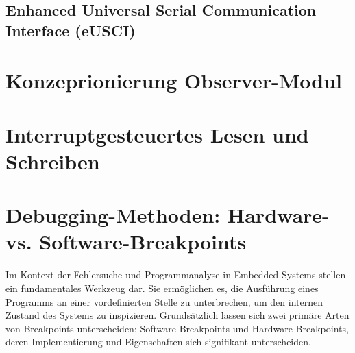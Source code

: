 \subsection{Enhanced Universal Serial Communication Interface (eUSCI)}
\label{eUSCI}



\section{Konzeprionierung Observer-Modul}
\label{Grundger\"ust_ObserverModul}

\section{Interruptgesteuertes Lesen und Schreiben}
\label{Interruptgesteuertes_Lesen&Schreiben}

\section{Debugging-Methoden: Hardware- vs. Software-Breakpoints}
\label{Hardware_VS_Software_Breakpoints}

Im Kontext der Fehlersuche und Programmanalyse in Embedded Systems stellen  ein fundamentales Werkzeug dar. Sie erm\"oglichen es, die Ausf\"uhrung eines Programms an einer vordefinierten Stelle zu unterbrechen, um den internen Zustand des Systems zu inspizieren. Grunds\"atzlich lassen sich zwei prim\"are Arten von Breakpoints unterscheiden: Software-Breakpoints und Hardware-Breakpoints, deren Implementierung und Eigenschaften sich signifikant unterscheiden.

